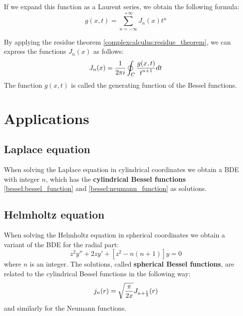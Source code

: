     \noindent If we expand this function as a Laurent series, we obtain the following formula:
    \begin{equation}
		\label{bessel:generating_function_expansion}
        g(x, t) = \sum_{n=-\infty}^{+\infty}J_n(x)t^n
	\end{equation}
    
    \noindent By applying the residue theorem \ref{complexcalculus:residue_theorem}, we can express the functions $J_n(x)$ as follows:
    \begin{equation}
		\label{bessel:generating_function_integral}
        J_n(x) = \stylefrac{1}{2\pi i}\oint_C\stylefrac{g(x, t)}{t^{n+1}}dt
	\end{equation}
    The function $g(x, t)$ is called the generating function of the Bessel functions.
    
\section{Applications}
\subsection{Laplace equation}
	When solving the Laplace equation in cylindrical coordinates we obtain a BDE with integer $n$, which has the \textbf{cylindrical Bessel functions} \ref{bessel:bessel_function} and \ref{bessel:neumann_function} as solutions.
    
\subsection{Helmholtz equation}
	When solving the Helmholtz equation in spherical coordinates we obtain a variant of the BDE for the radial part:
    \begin{equation}
		z^2y'' + 2zy' + [z^2 - n(n+1)]y = 0
	\end{equation}
    where $n$ is an integer. The solutions, called \textbf{spherical Bessel functions}, are related to the cylindrical Bessel functions in the following way:
    \begin{equation}
		j_n(r) = \sqrt{\stylefrac{\pi}{2x}}J_{n + \frac{1}{2}}(r)
	\end{equation}
    and similarly for the Neumann functions.